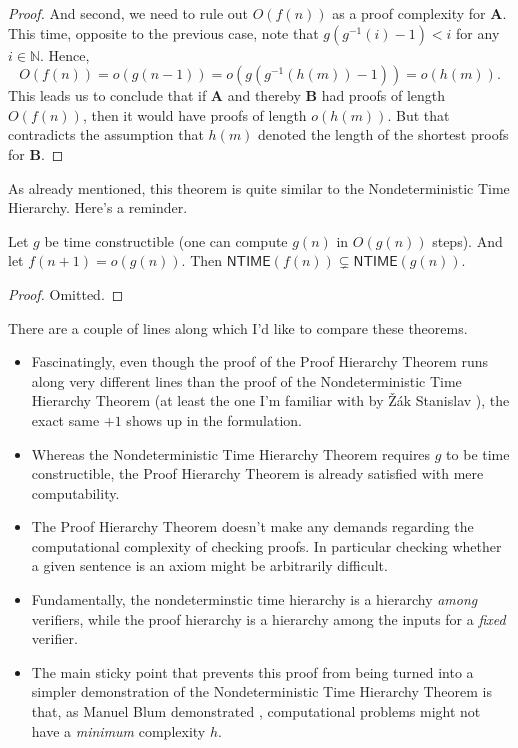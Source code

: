 \documentclass{article}
\theoremstyle{customstyle}
\newenvironment{prf}{\begin{mdframed}[skipabove=5pt, backgroundcolor=Gray!10, topline=false, bottomline=false, leftline=false, rightline=false]\begin{proof}}{\end{proof}\end{mdframed}}
\begin{document}
\begin{prf}
  And second, we need to rule out $O(f(n))$ as a proof complexity for $\mathbf{A}$. This time, opposite to the previous case, note that $g(g^{-1}(i) - 1) < i$ for any $i \in \mathbb{N}$. Hence,
  \[
    O(f(n)) = o(g(n-1)) = o(g(g^{-1}(h(m))-1)) = o(h(m)).
  \]
  This leads us to conclude that if $\mathbf{A}$ and thereby $\mathbf{B}$ had proofs of length $O(f(n))$, then it would have proofs of length $o(h(m))$. But that contradicts the assumption that $h(m)$ denoted the length of the shortest proofs for $\mathbf{B}$.
\end{prf}

As already mentioned, this theorem is quite similar to the Nondeterministic Time Hierarchy. Here's a reminder.

\begin{theorem}
  Let $g$ be time constructible (one can compute $g(n)$ in $O(g(n))$ steps). And let $f(n+1) = o(g(n))$. Then $\mathsf{NTIME}(f(n)) \subsetneq \mathsf{NTIME}(g(n))$.
\end{theorem}

\begin{prf}
  Omitted.
\end{prf}

There are a couple of lines along which I'd like to compare these theorems.

\begin{itemize}
  \item Fascinatingly, even though the proof of the Proof Hierarchy Theorem runs along very different lines than the proof of the Nondeterministic Time Hierarchy Theorem (at least the one I'm familiar with by \v{Z}ák Stanislav \cite{stanislav}), the exact same $+1$ shows up in the formulation.
  \item Whereas the Nondeterministic Time Hierarchy Theorem requires $g$ to be time constructible, the Proof Hierarchy Theorem is already satisfied with mere computability.
  \item The Proof Hierarchy Theorem doesn't make any demands regarding the computational complexity of checking proofs. In particular checking whether a given sentence is an axiom might be arbitrarily difficult.
  \item Fundamentally, the nondeterminstic time hierarchy is a hierarchy \emph{among} verifiers, while the proof hierarchy is a hierarchy among the inputs for a \emph{fixed} verifier.
  \item The main sticky point that prevents this proof from being turned into a simpler demonstration of the Nondeterministic Time Hierarchy Theorem is that, as Manuel Blum demonstrated \cite{blum}, computational problems might not have a \emph{minimum} complexity $h$.
\end{itemize}
\end{document}
